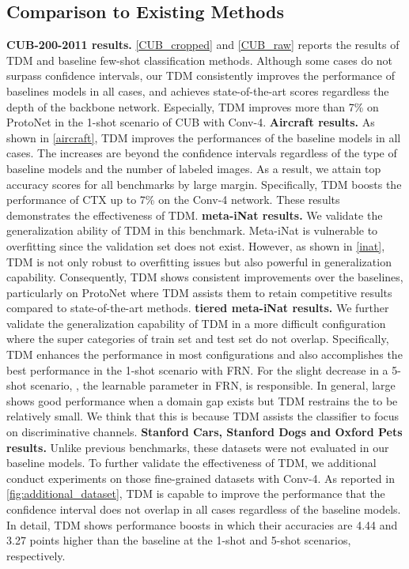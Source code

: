 \subsection{Comparison to Existing Methods}
\noindent\textbf{CUB-200-2011 results.} \cref{CUB_cropped} and \cref{CUB_raw} reports the results of TDM and baseline few-shot classification methods. 
Although some cases do not surpass confidence intervals, our TDM consistently improves the performance of baselines models in all cases, and achieves state-of-the-art scores regardless the depth of the backbone network.
Especially, TDM improves more than 7\% on ProtoNet in the 1-shot scenario of CUB with Conv-4. 
\newline
\textbf {Aircraft results.} 
As shown in \cref{aircraft}, TDM improves the performances of the baseline models in all cases. 
The increases are beyond the confidence intervals regardless of the type of baseline models and the number of labeled images. 
As a result, we attain top accuracy scores for all benchmarks by large margin. Specifically, TDM boosts the performance of CTX\cite{doersch2020crosstransformers} up to 7\% on the Conv-4 network.
These results demonstrates the effectiveness of TDM.
\newline
\textbf{meta-iNat results.} 
We validate the generalization ability of TDM in this benchmark. 
Meta-iNat is vulnerable to overfitting since the validation set does not exist.
However, as shown in \cref{inat}, TDM is not only robust to overfitting issues but also powerful in generalization capability.
Consequently, TDM shows consistent improvements over the baselines, particularly on ProtoNet where TDM assists them to retain competitive results compared to state-of-the-art methods.
\newline
\textbf{tiered meta-iNat results.} 
We further validate the generalization capability of TDM in a more difficult configuration where the super categories of train set and test set do not overlap. 
Specifically, TDM enhances the performance in most configurations and also accomplishes the best performance in the 1-shot scenario with FRN. 
For the slight decrease in a 5-shot scenario, , the learnable parameter in FRN, is responsible. 
In general, large  shows good performance when a domain gap exists but TDM restrains the  to be relatively small.
We think that this is because TDM assists the classifier to focus on discriminative channels\cite{wertheimer2021few}.
\newline
\textbf{Stanford Cars, Stanford Dogs and Oxford Pets results.} 
Unlike previous benchmarks, these datasets were not evaluated in our baseline models\cite{snell2017prototypical, simon2020adaptive, doersch2020crosstransformers ,wertheimer2021few}. 
To further validate the effectiveness of TDM, we additional conduct experiments on those fine-grained datasets with Conv-4.
As reported in \cref{fig:additional_dataset}, TDM is capable to improve the performance that the confidence interval does not overlap in all cases regardless of the baseline models.
In detail, TDM shows performance boosts in which their accuracies are 4.44 and 3.27 points higher than the baseline at the 1-shot and 5-shot scenarios, respectively.

